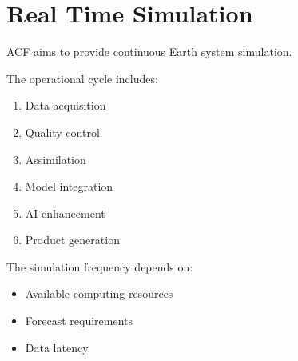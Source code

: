 \section{Real Time Simulation}


ACF aims to provide continuous Earth system simulation.


The operational cycle includes:


\begin{enumerate}

\item Data acquisition

\item Quality control

\item Assimilation

\item Model integration

\item AI enhancement

\item Product generation

\end{enumerate}



The simulation frequency depends on:


\begin{itemize}

\item Available computing resources

\item Forecast requirements

\item Data latency

\end{itemize}
